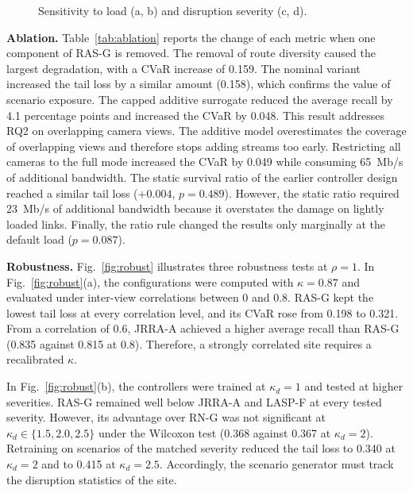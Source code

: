 \documentclass[letterpaper,journal]{IEEEtran}
\begin{document}
\begin{figure}[t]
\centering

\caption{Sensitivity to load (a, b) and disruption severity (c, d).}
\label{fig:loadsev}
\end{figure}

\textbf{Ablation.} Table~\ref{tab:ablation} reports the change of each metric when one component of RAS-G is removed. The removal of route diversity caused the largest degradation, with a CVaR increase of 0.159. The nominal variant increased the tail loss by a similar amount (0.158), which confirms the value of scenario exposure. The capped additive surrogate reduced the average recall by 4.1 percentage points and increased the CVaR by 0.048. This result addresses RQ2 on overlapping camera views. The additive model overestimates the coverage of overlapping views and therefore stops adding streams too early. Restricting all cameras to the full mode increased the CVaR by 0.049 while consuming 65~Mb/s of additional bandwidth. The static survival ratio of the earlier controller design reached a similar tail loss ($+0.004$, $p=0.489$). However, the static ratio required 23~Mb/s of additional bandwidth because it overstates the damage on lightly loaded links. Finally, the ratio rule changed the results only marginally at the default load ($p=0.087$).



\textbf{Robustness.} Fig.~\ref{fig:robust} illustrates three robustness tests at $\rho=1$. In Fig.~\ref{fig:robust}(a), the configurations were computed with $\kappa=0.87$ and evaluated under inter-view correlations between 0 and 0.8. RAS-G kept the lowest tail loss at every correlation level, and its CVaR rose from 0.198 to 0.321. From a correlation of 0.6, JRRA-A achieved a higher average recall than RAS-G (0.835 against 0.815 at 0.8). Therefore, a strongly correlated site requires a recalibrated $\kappa$.

In Fig.~\ref{fig:robust}(b), the controllers were trained at $\kappa_d=1$ and tested at higher severities. RAS-G remained well below JRRA-A and LASP-F at every tested severity. However, its advantage over RN-G was not significant at $\kappa_d\in\{1.5,2.0,2.5\}$ under the Wilcoxon test (0.368 against 0.367 at $\kappa_d=2$). Retraining on scenarios of the matched severity reduced the tail loss to 0.340 at $\kappa_d=2$ and to 0.415 at $\kappa_d=2.5$. Accordingly, the scenario generator must track the disruption statistics of the site.
\end{document}
